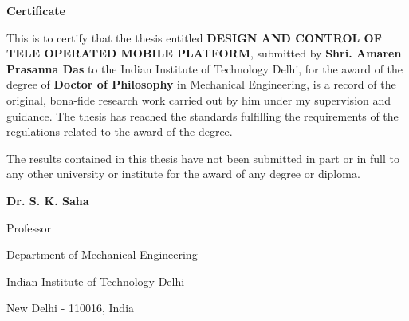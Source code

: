\doublespacing
\newpage
\thispagestyle{empty}
\mbox{}
\newpage
\thispagestyle{empty}
\begin{center}
\textbf{\Large{Certificate}}
\end{center}
This is to certify that the thesis entitled \textbf{DESIGN AND CONTROL OF TELE OPERATED MOBILE PLATFORM}, submitted by   \textbf{Shri. Amaren Prasanna Das} to the Indian Institute of Technology Delhi, for the award of the degree of \textbf{Doctor of Philosophy} in Mechanical Engineering, is a record of the original, bona-fide research work carried out by him under my supervision and guidance. The thesis has reached the standards fulfilling the requirements of the regulations related to the award of the degree.

The results contained in this thesis have not been submitted in part or in full to any other university or institute for the award of any degree or diploma.
\bigskip
\bigskip
\bigskip
\bigskip
\bigskip


\textbf{Dr. S. K. Saha}

Professor

Department of Mechanical Engineering

Indian Institute of Technology Delhi

New Delhi - 110016, India






\restoregeometry
